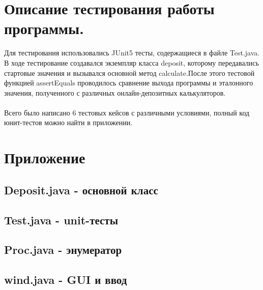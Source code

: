 \section{Описание тестирования работы программы.}
Для тестирования использовались JUnit5 тесты, содержащиеся в файле Test.java.
\\В ходе тестирование создавался экземпляр класса deposit, которому передавались стартовые значения и вызывался основной метод calculate.После этого тестовой функцией assertEquals проводилось сравнение выхода программы и эталонного значения, полученного с различных онлайн-депозитных калькуляторов.\\
\\Всего было написано 6 тестовых кейсов с различными условиями, полный код юнит-тестов можно найти в приложении.
\newpage
\section{Приложение}
\subsection{Deposit.java - основной класс}

\subsection{Test.java - unit-тесты}

\subsection{Proc.java - энумератор}

\subsection{wind.java - GUI и ввод}


